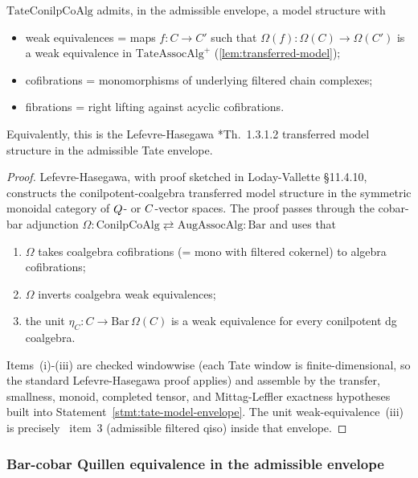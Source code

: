 \begin{lem}\label{lem:tate-conilp-model}
  $\mathrm{TateConilpCoAlg}$ admits, in the admissible envelope, a
  model structure with
  \begin{itemize}
    \item weak equivalences = maps $f\colon C\to C'$ such that
      $\Omega(f)\colon\Omega(C)\to\Omega(C')$ is a weak
      equivalence in $\mathrm{TateAssocAlg}^+$
      (\ref{lem:transferred-model});
    \item cofibrations = monomorphisms of underlying filtered
      chain complexes;
    \item fibrations = right lifting against acyclic cofibrations.
  \end{itemize}
  Equivalently, this is the Lefevre-Hasegawa
  \cite{lefevre-hasegawa}*{Th.~1.3.1.2} transferred model structure
  in the admissible Tate envelope.
\end{lem}

\begin{proof}
  Lefevre-Hasegawa, with proof sketched in Loday-Vallette
  \S 11.4.10, constructs the conilpotent-coalgebra transferred
  model structure in the symmetric monoidal category of $Q$- or
  $C$-vector spaces. The proof passes through the cobar-bar
  adjunction $\Omega\colon\mathrm{ConilpCoAlg}\rightleftarrows
  \mathrm{AugAssocAlg}\colon\mathrm{Bar}$ and uses that
  \begin{enumerate}[label=(\roman*)]
    \item $\Omega$ takes coalgebra cofibrations (= mono with
      filtered cokernel) to algebra cofibrations;
    \item $\Omega$ inverts coalgebra weak equivalences;
    \item the unit $\eta_C\colon C\to\mathrm{Bar}\,\Omega(C)$ is a
      weak equivalence for every conilpotent dg coalgebra.
  \end{enumerate}
  Items~(i)-(iii) are checked windowwise (each Tate window is
  finite-dimensional, so the standard Lefevre-Hasegawa proof
  applies) and assemble by the transfer, smallness, monoid, completed
  tensor, and Mittag-Leffler exactness hypotheses built into
  Statement~\ref{stmt:tate-model-envelope}. The unit
  weak-equivalence~(iii) is precisely \alpharef\ item~3
  (admissible filtered qiso) inside that envelope.
\end{proof}

\subsubsection{Bar-cobar Quillen equivalence in the admissible envelope}

